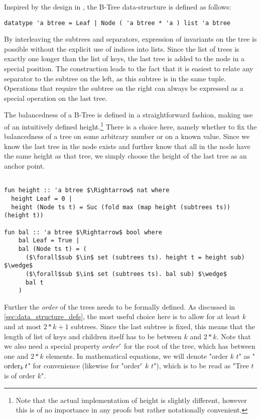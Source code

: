 
Inspired by the design in \parencite{DBLP:conf/popl/MalechaMSW10}, the B-Tree data-structure is defined as follows:

\begin{lstlisting}[mathescape=true, language=Isabelle,label=lst:btree-def]
datatype 'a btree = Leaf | Node ( 'a btree * 'a ) list 'a btree
\end{lstlisting}

By interleaving the subtrees and separators, expression of invariants
on the tree is possible without the explicit use of indices into lists.
Since the list of trees is exactly one longer than the list of keys,
the last tree is added to the node in a special position.
The construction leads to the fact that it is easiest to relate any separator
to the subtree on the left, as this subtree is in the same tuple.
Operations that require the subtree on the right can always be expressed as a special
operation on the last tree.

The balancedness of a B-Tree is defined in a straightforward fashion, making use
of an intuitively defined height.\footnote{
    Note that the actual implementation of height is slightly different,
    however this is of no importance in any proofs but rather notationally convenient.
}
There is a choice here, namely whether to fix the balancedness of a tree
on some arbitrary number or on a known value.
Since we know the last tree in the node exists and further
know that all in the node have the same height as that tree,
we simply choose the height of the last tree as an anchor point.

\begin{lstlisting}[mathescape=true, language=Isabelle]

fun height :: 'a btree $\Rightarrow$ nat where
  height Leaf = 0 |
  height (Node ts t) = Suc (fold max (map height (subtrees ts)) (height t))

fun bal :: 'a btree $\Rightarrow$ bool where
    bal Leaf = True |
    bal (Node ts t) = (
      ($\forall$sub $\in$ set (subtrees ts). height t = height sub) $\wedge$
      ($\forall$sub $\in$ set (subtrees ts). bal sub) $\wedge$
      bal t
    )
\end{lstlisting}

Further the \textit{order} of the trees needs to be formally defined.
As discussed in \autoref{sec:data_structure_defs}, the most useful choice here is
to allow for at least $k$ and at most $2*k+1$ subtrees.
Since the last subtree is fixed, this means that the length of list of keys and children
itself has to be between $k$ and $2*k$.
Note that we also need a special property $order^r$ for the root of the tree,
which has between one and $2*k$ elements.
In mathematical equations, we will denote "order $k$ $t$" as "$\operatorname{order}_k t$"
for convenience (likewise for "order$^r$ $k$ $t$"), which is to be read as
"Tree $t$ is of order $k$".

